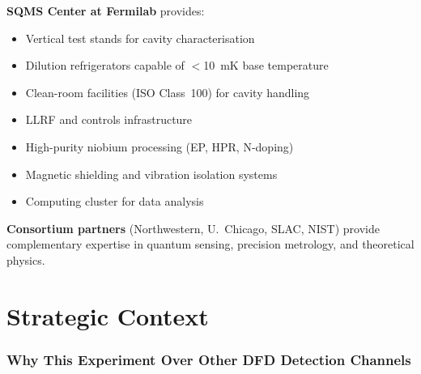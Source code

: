 \documentclass[11pt]{article}
\begin{document}
\textbf{SQMS Center at Fermilab} provides:
\begin{itemize}[nosep]
\item Vertical test stands for cavity characterisation
\item Dilution refrigerators capable of $<$10~mK base temperature
\item Clean-room facilities (ISO Class~100) for cavity handling
\item LLRF and controls infrastructure
\item High-purity niobium processing (EP, HPR, N-doping)
\item Magnetic shielding and vibration isolation systems
\item Computing cluster for data analysis
\end{itemize}

\textbf{Consortium partners} (Northwestern, U.\ Chicago, SLAC, NIST)
provide complementary expertise in quantum sensing, precision
metrology, and theoretical physics.


\part{Strategic Context}

\section{Why This Experiment Over Other DFD Detection Channels}
\label{sec:comparison}
\end{document}
